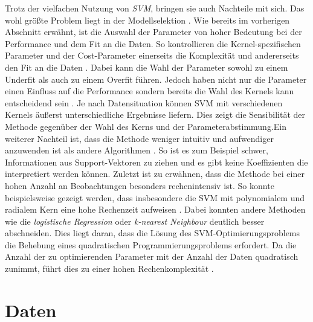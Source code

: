 \documentclass[
]{article}
\begin{document}
Trotz der vielfachen Nutzung von \textit{SVM}, bringen sie auch
Nachteile mit sich. Das wohl größte Problem liegt in der Modellselektion
\parencite{bennettSupportVectorMachines2000}. Wie bereits im vorherigen
Abschnitt erwähnt, ist die Auswahl der Parameter von hoher Bedeutung bei
der Performance und dem Fit an die Daten. So kontrollieren die
Kernel-spezifischen Parameter und der Cost-Parameter einerseits die
Komplexität und andererseits den Fit an die Daten
\parencite{kuhnAppliedPredictiveModeling2013}. Dabei kann die Wahl der
Parameter sowohl zu einem Underfit als auch zu einem Overfit führen.
Jedoch haben nicht nur die Parameter einen Einfluss auf die Performance
sondern bereits die Wahl des Kernels kann entscheidend sein
\parencite{burgesTutorialSupportVector1998}. Je nach Datensituation
können SVM mit verschiedenen Kernels äußerst unterschiedliche Ergebnisse
liefern. Dies zeigt die Sensibilität der Methode gegenüber der Wahl des
Kerns und der Parameterabstimmung.\newline Ein weiterer Nachteil ist,
dass die Methode weniger intuitiv und aufwendiger anzuwenden ist als
andere Algorithmen \parencite{bennettSupportVectorMachines2000}. So ist
es zum Beispiel schwer, Informationen aus Support-Vektoren zu ziehen und
es gibt keine Koeffizienten die interpretiert werden können.\newline
Zuletzt ist zu erwähnen, dass die Methode bei einer hohen Anzahl an
Beobachtungen besonders rechenintensiv ist. So konnte beispielsweise
gezeigt werden, dass insbesondere die SVM mit polynomialem und radialem
Kern eine hohe Rechenzeit aufweisen
\parencite{scholzComparisonClassificationMethods2021}. Dabei konnten
andere Methoden wie die \textit{logistische Regression} oder
\textit{k-nearest Neighbour} deutlich besser abschneiden. Dies liegt
daran, dass die Lösung des SVM-Optimierungsproblems die Behebung eines
quadratischen Programmierungsproblems erfordert. Da die Anzahl der zu
optimierenden Parameter mit der Anzahl der Daten quadratisch zunimmt,
führt dies zu einer hohen Rechenkomplexität
\parencite{kecmanSupportVectorMachines2005}.

\section{Daten}
\end{document}

